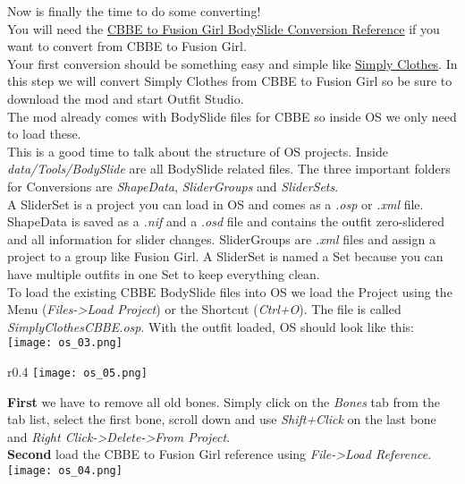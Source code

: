 Now is finally the time to do some converting!\\
You will need the \href{https://www.nexusmods.com/fallout4/mods/37380}{CBBE to Fusion Girl BodySlide Conversion Reference} if 
you want to convert from CBBE to Fusion Girl.\\
Your first conversion should be something easy and simple like \href{https://www.nexusmods.com/fallout4/mods/6935}{Simply Clothes}.
In this step we will convert Simply Clothes from CBBE to Fusion Girl so be sure to download the mod and start Outfit Studio.\\
The mod already comes with BodySlide files for CBBE so inside OS we only need to load these.\\
This is a good time to talk about the structure of OS projects. Inside \textit{data/Tools/BodySlide} are all BodySlide related files.
The three important folders for Conversions are \textit{ShapeData}, \textit{SliderGroups} and \textit{SliderSets}.\\
A SliderSet is a project you can load in OS and comes as a \textit{.osp} or \textit{.xml} file. ShapeData is saved as a \textit{.nif} 
and a \textit{.osd} file and contains the outfit zero-slidered and all information for slider changes. SliderGroups are \textit{.xml} files 
and assign a project to a group like Fusion Girl. A SliderSet is named a Set because you can have multiple outfits in one Set to keep 
everything clean.\\
To load the existing CBBE BodySlide files into OS we load the Project using the Menu (\textit{Files->Load Project}) or the Shortcut (\textit{Ctrl+O}).
The file is called \textit{SimplyClothesCBBE.osp}. With the outfit loaded, OS should look like this:\\
\texttt{[image: os\_03.png]}\\
\begin{wrapfigure}[5]{r}{0.4\textwidth}
    \vspace{-20pt}
    \texttt{[image: os\_05.png]}
\end{wrapfigure}
\textbf{First} we have to remove all old bones. Simply click on the \textit{Bones} tab from the tab list, select the first bone, 
scroll down and use \textit{Shift+Click} on the last bone and \textit{Right Click->Delete->From Project}.\\
\textbf{Second} load the CBBE to Fusion Girl reference using \textit{File->Load Reference}.\\
\texttt{[image: os\_04.png]}\\
